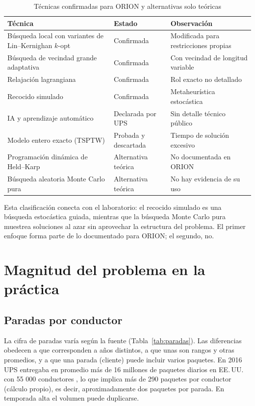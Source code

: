 \documentclass[11pt,a4paper]{article}
\begin{document}
\begin{table}[ht]
\centering\small
\caption{Técnicas confirmadas para ORION y alternativas solo teóricas}
\label{tab:tecnicas}
\begin{tabularx}{\textwidth}{@{}>{\raggedright\arraybackslash}p{4.5cm} >{\raggedright\arraybackslash}p{3.0cm} X@{}}
\toprule
Técnica & Estado & Observación \\
\midrule
Búsqueda local con variantes de Lin--Kernighan $k$-opt & Confirmada \parencite{holland2017} & Modificada para restricciones propias \\
Búsqueda de vecindad grande adaptativa & Confirmada \parencite{holland2017} & Con vecindad de longitud variable \\
Relajación lagrangiana & Confirmada \parencite{holland2017} & Rol exacto no detallado \\
Recocido simulado & Confirmada \parencite{holland2017} & Metaheurística estocástica \\
IA y aprendizaje automático & Declarada por UPS \parencite{ups2020} & Sin detalle técnico público \\
Modelo entero exacto (TSPTW) & Probada y descartada \parencite{holland2017} & Tiempo de solución excesivo \\
Programación dinámica de Held--Karp \parencite{held1962} & Alternativa teórica & No documentada en ORION \\
Búsqueda aleatoria Monte Carlo pura & Alternativa teórica & No hay evidencia de su uso \\
\bottomrule
\end{tabularx}
\end{table}

Esta clasificación conecta con el laboratorio: el recocido simulado es una búsqueda estocástica guiada, mientras que la búsqueda Monte Carlo pura muestrea soluciones al azar sin aprovechar la estructura del problema. El primer enfoque forma parte de lo documentado para ORION; el segundo, no.

\section{Magnitud del problema en la práctica}
\subsection{Paradas por conductor}
La cifra de paradas varía según la fuente (Tabla~\ref{tab:paradas}). Las diferencias obedecen a que corresponden a años distintos, a que unas son rangos y otras promedios, y a que una parada (cliente) puede incluir varios paquetes. En 2016 UPS entregaba en promedio más de 16 millones de paquetes diarios en EE.\,UU. con 55 000 conductores \parencite{holland2017}, lo que implica más de 290 paquetes por conductor (cálculo propio), es decir, aproximadamente dos paquetes por parada. En temporada alta el volumen puede duplicarse.
\end{document}
